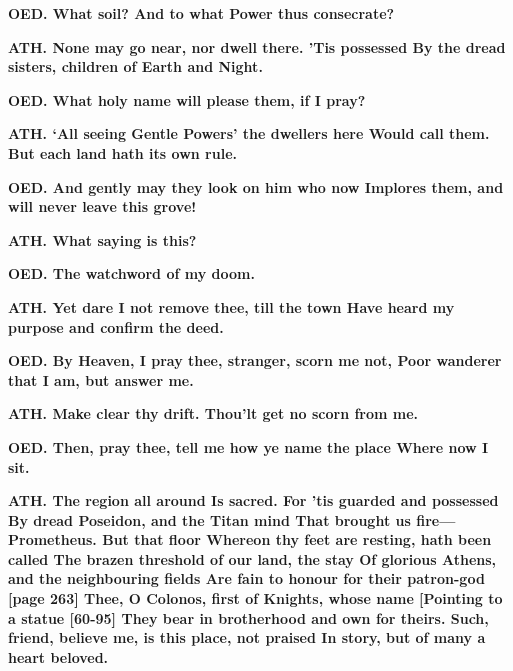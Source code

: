 \documentclass[11pt,letter]{book}
\begin{document}
\par \textbf{OED. What soil? And to what Power thus consecrate?}
\par 

\par \textbf{ATH. None may go near, nor dwell there. ’Tis possessed By the dread sisters, children of Earth and Night.}
\par 

\par \textbf{OED. What holy name will please them, if I pray?}
\par 

\par \textbf{ATH. ‘All seeing Gentle Powers’ the dwellers here Would call them. But each land hath its own rule.}
\par 

\par \textbf{OED. And gently may they look on him who now Implores them, and will never leave this grove!}
\par 

\par \textbf{ATH. What saying is this?}
\par 

\par \textbf{OED. The watchword of my doom.}
\par 

\par \textbf{ATH. Yet dare I not remove thee, till the town Have heard my purpose and confirm the deed.}
\par 

\par \textbf{OED. By Heaven, I pray thee, stranger, scorn me not, Poor wanderer that I am, but answer me.}
\par 

\par \textbf{ATH. Make clear thy drift. Thou’lt get no scorn from me.}
\par 

\par \textbf{OED. Then, pray thee, tell me how ye name the place Where now I sit.}
\par 

\par \textbf{ATH. The region all around Is sacred. For ’tis guarded and possessed By dread Poseidon, and the Titan mind That brought us fire—Prometheus. But that floor Whereon thy feet are resting, hath been called The brazen threshold of our land, the stay Of glorious Athens, and the neighbouring fields Are fain to honour for their patron-god [page 263] Thee, O Colonos, first of Knights, whose name [Pointing to a statue [60-95] They bear in brotherhood and own for theirs. Such, friend, believe me, is this place, not praised In story, but of many a heart beloved.}
\par 
\end{document}
